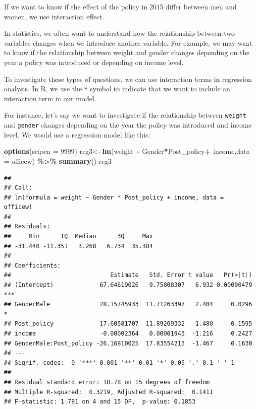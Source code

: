\documentclass[
]{article}
\newenvironment{Shaded}{\begin{snugshade}}{\end{snugshade}}
\newcommand{\AttributeTok}[1]{\textcolor[rgb]{0.13,0.29,0.53}{#1}}
\newcommand{\DecValTok}[1]{\textcolor[rgb]{0.00,0.00,0.81}{#1}}
\newcommand{\FunctionTok}[1]{\textcolor[rgb]{0.13,0.29,0.53}{\textbf{#1}}}
\newcommand{\NormalTok}[1]{#1}
\newcommand{\OtherTok}[1]{\textcolor[rgb]{0.56,0.35,0.01}{#1}}
\newcommand{\SpecialCharTok}[1]{\textcolor[rgb]{0.81,0.36,0.00}{\textbf{#1}}}
\begin{document}
If we want to know if the effect of the policy in 2015 differ between
men and women, we use interaction effect.

In statistics, we often want to understand how the relationship between
two variables changes when we introduce another variable. For example,
we may want to know if the relationship between weight and gender
changes depending on the year a policy was introduced or depending on
income level.

To investigate these types of questions, we can use interaction terms in
regression analysis. In R, we use the \texttt{*} symbol to indicate that
we want to include an interaction term in our model.

For instance, let's say we want to investigate if the relationship
between \texttt{weight} and \texttt{gender} changes depending on the
year the policy was introduced and income level. We would use a
regression model like this:

\begin{Shaded}
\begin{Highlighting}[]
\FunctionTok{options}\NormalTok{(}\AttributeTok{scipen =} \DecValTok{9999}\NormalTok{)}
\NormalTok{reg3}\OtherTok{\textless{}{-}} \FunctionTok{lm}\NormalTok{(weight }\SpecialCharTok{\textasciitilde{}}\NormalTok{ Gender}\SpecialCharTok{*}\NormalTok{Post\_policy}\SpecialCharTok{+}\NormalTok{ income,}\AttributeTok{data =}\NormalTok{ officew) }\SpecialCharTok{\%\textgreater{}\%} 
\FunctionTok{summary}\NormalTok{()}
\NormalTok{reg3}
\end{Highlighting}
\end{Shaded}

\begin{verbatim}
## 
## Call:
## lm(formula = weight ~ Gender * Post_policy + income, data = officew)
## 
## Residuals:
##     Min      1Q  Median      3Q     Max 
## -31.440 -11.351   3.268   6.734  35.384 
## 
## Coefficients:
##                            Estimate   Std. Error t value   Pr(>|t|)    
## (Intercept)             67.64619026   9.75808307   6.932 0.00000479 ***
## GenderMale              28.15745933  11.71263397   2.404     0.0296 *  
## Post_policy             17.60581707  11.89269332   1.480     0.1595    
## income                  -0.00002364   0.00001943  -1.216     0.2427    
## GenderMale:Post_policy -26.16810025  17.83554213  -1.467     0.1630    
## ---
## Signif. codes:  0 '***' 0.001 '**' 0.01 '*' 0.05 '.' 0.1 ' ' 1
## 
## Residual standard error: 18.78 on 15 degrees of freedom
## Multiple R-squared:  0.3219, Adjusted R-squared:  0.1411 
## F-statistic: 1.781 on 4 and 15 DF,  p-value: 0.1853
\end{verbatim}
\end{document}
